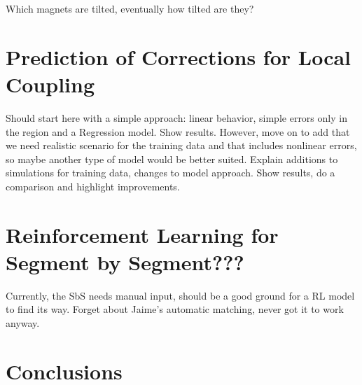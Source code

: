 Which magnets are tilted, eventually how tilted are they?


\section{Prediction of Corrections for Local Coupling}

Should start here with a simple approach: linear behavior, simple errors only in the region and a Regression model.
Show results.
However, move on to add that we need realistic scenario for the training data and that includes nonlinear errors, so maybe another type of model would be better suited.
Explain additions to simulations for training data, changes to model approach.
Show results, do a comparison and highlight improvements.


\section{Reinforcement Learning for Segment by Segment???}

Currently, the SbS needs manual input, should be a good ground for a RL model to find its way.
Forget about Jaime's automatic matching, never got it to work anyway.


\section{Conclusions}

